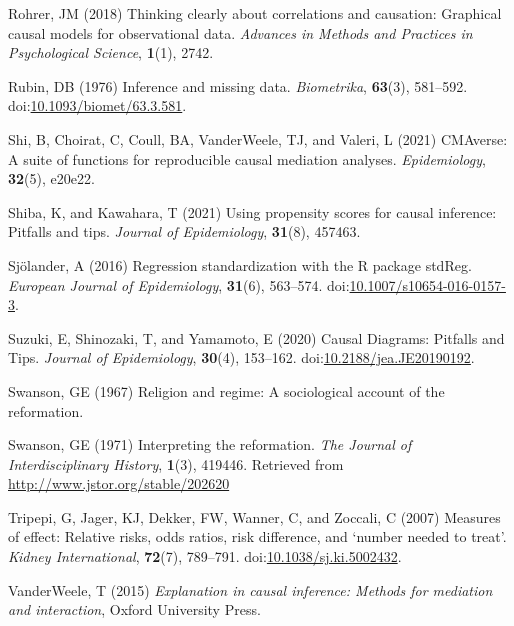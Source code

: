 \documentclass[
  singlecolumn,
  9pt]{article}
\newlength{\cslhangindent}
\newenvironment{CSLReferences}[2] %
 {\begin{list}{}{%
  \setlength{\itemindent}{0pt}
  \setlength{\leftmargin}{0pt}
  \setlength{\parsep}{0pt}
  \ifodd #1
   \setlength{\leftmargin}{\cslhangindent}
   \setlength{\itemindent}{-1\cslhangindent}
  \fi
  \setlength{\itemsep}{#2\baselineskip}}}
 {\end{list}}
\begin{document}
\begin{CSLReferences}{1}{0}
Rohrer, JM (2018) Thinking clearly about correlations and causation:
Graphical causal models for observational data. \emph{Advances in
Methods and Practices in Psychological Science}, \textbf{1}(1), 2742.

Rubin, DB (1976) Inference and missing data. \emph{Biometrika},
\textbf{63}(3), 581--592.
doi:\href{https://doi.org/10.1093/biomet/63.3.581}{10.1093/biomet/63.3.581}.

Shi, B, Choirat, C, Coull, BA, VanderWeele, TJ, and Valeri, L (2021)
CMAverse: A suite of functions for reproducible causal mediation
analyses. \emph{Epidemiology}, \textbf{32}(5), e20e22.

Shiba, K, and Kawahara, T (2021) Using propensity scores for causal
inference: Pitfalls and tips. \emph{Journal of Epidemiology},
\textbf{31}(8), 457463.

Sjölander, A (2016) Regression standardization with the R package
stdReg. \emph{European Journal of Epidemiology}, \textbf{31}(6),
563--574.
doi:\href{https://doi.org/10.1007/s10654-016-0157-3}{10.1007/s10654-016-0157-3}.

Suzuki, E, Shinozaki, T, and Yamamoto, E (2020) Causal Diagrams:
Pitfalls and Tips. \emph{Journal of Epidemiology}, \textbf{30}(4),
153--162.
doi:\href{https://doi.org/10.2188/jea.JE20190192}{10.2188/jea.JE20190192}.

Swanson, GE (1967) Religion and regime: A sociological account of the
reformation.

Swanson, GE (1971) Interpreting the reformation. \emph{The Journal of
Interdisciplinary History}, \textbf{1}(3), 419446. Retrieved from
\url{http://www.jstor.org/stable/202620}

Tripepi, G, Jager, KJ, Dekker, FW, Wanner, C, and Zoccali, C (2007)
Measures of effect: Relative risks, odds ratios, risk difference, and
{`}number needed to treat{'}. \emph{Kidney International},
\textbf{72}(7), 789--791.
doi:\href{https://doi.org/10.1038/sj.ki.5002432}{10.1038/sj.ki.5002432}.

VanderWeele, T (2015) \emph{Explanation in causal inference: Methods for
mediation and interaction}, Oxford University Press.


\end{CSLReferences}
\end{document}
